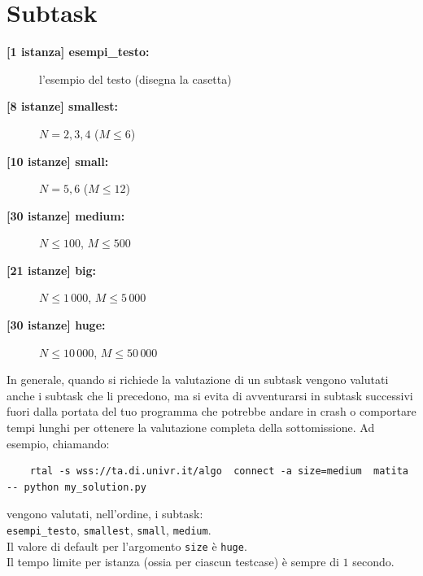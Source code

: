 \documentclass[a4paper,11pt]{article}
\begin{document}
\section*{Subtask}
\begin{description}
  \item[\textbf{\hspace{1ex}[1 istanza] esempi\_testo:}] l'esempio del testo (disegna la casetta)
  \item [\textbf{[8 istanze] smallest:}] $N = 2, 3, 4$ ($M \leq 6$)
  \item [\textbf{[10 istanze] small:}] $N = 5, 6$ ($M \leq 12$)
  \item [\textbf{[30 istanze] medium:}] $N \leq 100$, $M \leq 500$
  \item [\textbf{[21 istanze] big:}] $N \leq 1\,000$, $M \leq 5\,000$
  \item [\textbf{[30 istanze] huge:}] $N \leq 10\,000$, $M \leq 50\,000$
\end{description}

In generale, quando si richiede la valutazione di un subtask vengono valutati anche i subtask che li precedono, ma si evita di avventurarsi in subtask successivi  fuori dalla portata del tuo programma che potrebbe andare in crash o comportare tempi lunghi per ottenere la valutazione completa della sottomissione. Ad esempio, chiamando:

\begin{verbatim}
    rtal -s wss://ta.di.univr.it/algo  connect -a size=medium  matita -- python my_solution.py
\end{verbatim}

\noindent
vengono valutati, nell'ordine, i subtask:\\

{\tt esempi\_testo}, {\tt smallest}, {\tt small}, {\tt medium}.\\

\noindent
Il valore di default per l'argomento {\tt size} è {\tt huge}.\\

\noindent
Il tempo limite per istanza (ossia per ciascun testcase) è sempre di $1$ secondo.
\end{document}
